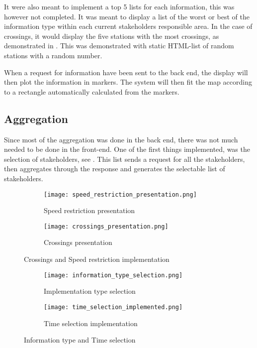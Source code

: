 It were also meant to implement a top 5 lists for each information, this was
however not completed. It was meant to display a list of the worst or best of
the information type within each current stakeholders responsible area. In the
case of crossings, it would display the five stations with the most crossings,
as demonstrated in . This was demonstrated with 
static HTML-list of random stations with a random number.

When a request for information have been sent to the back end, the display will
then plot the information in markers. The system will then fit the map
according to a rectangle automatically calculated from the markers.

\subsection{Aggregation} %
\label{sub:front_end_aggregation}
Since most of the aggregation was done in the back end, there was not much
needed to be done in the front-end. One of the first things implemented, was 
the selection of stakeholders, see . This 
list sends a request for all the stakeholders, then aggregates through the 
response and generates the selectable list of stakeholders. 


\begin{figure}[h!tbp]
	\centering
	\begin{subfigure}{0.6\textwidth}
		\texttt{[image: speed\_restriction\_presentation.png]}
		\caption[Speed restriction presentation]{Speed restriction presentation}
		\label{fig:speed_restriction_presentation}
	\end{subfigure}
	\begin{subfigure}{0.25\textwidth}
		\texttt{[image: crossings\_presentation.png]}
		\caption[Crossings presentation]{Crossings presentation}
		\label{fig:crossings_presentation}
	\end{subfigure}
	\caption[Crossings and Speed restriction implementation]{Crossings and Speed restriction
	implementation}
	\label{fig:crossings_and_speed_restriction_implementation}
\end{figure}

\begin{figure}[h!tbp]
	\centering
	\begin{subfigure}{0.3\textwidth}
		\texttt{[image: information\_type\_selection.png]}
		\caption[Implementation type selection]{Implementation type selection}
		\label{fig:implementation_type_selection}
	\end{subfigure}
	\begin{subfigure}{0.6\textwidth}
		\texttt{[image: time\_selection\_implemented.png]}
		\caption[Time selection implementation]{Time selection implementation}
		\label{fig:time_selection_implemented}
	\end{subfigure}
	\caption[Information type and Time selection]{Information type and Time selection}
	\label{fig:information_type_and_time_selection}
\end{figure}

